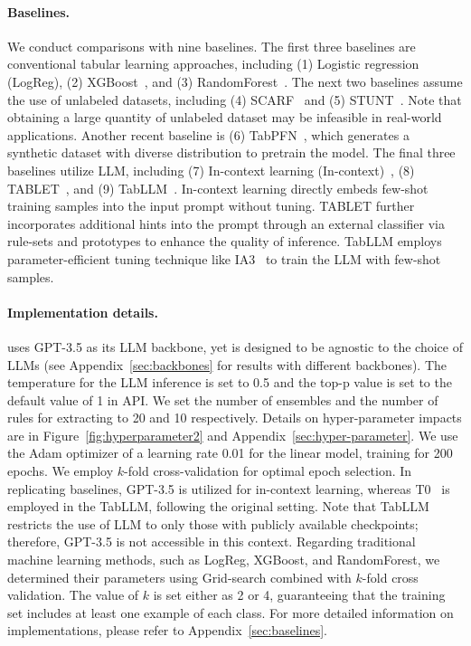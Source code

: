 \documentclass{article}
\theoremstyle{plain}
\theoremstyle{definition}
\theoremstyle{remark}
\newcommand{\cutparagraphup}{\vspace*{-0.12in}}
\begin{document}
\cutparagraphup
\paragraph{Baselines.}
We conduct comparisons with nine baselines. The first three baselines are conventional tabular learning approaches, including (1) Logistic regression (LogReg), (2) XGBoost~\cite{chen2016xgboost}, and (3) RandomForest~\cite{ho1995random}. The next two baselines assume the use of unlabeled datasets, including (4) SCARF~\cite{bahri2022scarf} and (5) STUNT~\cite{nam2023stunt}. Note that obtaining a large quantity of unlabeled dataset may be infeasible in real-world applications. Another recent baseline is (6) TabPFN~\cite{hollmann2022tabpfn}, which generates a synthetic dataset with diverse distribution to pretrain the model. The final three baselines utilize LLM, including (7) In-context learning (In-context)~\cite{wei2022emergent}, (8) TABLET~\cite{slack2023tablet}, and (9) TabLLM~\cite{hegselmann2023tabllm}. In-context learning directly embeds few-shot training samples into the input prompt without tuning. TABLET further incorporates additional hints into the prompt through an external classifier via rule-sets and prototypes to enhance the quality of inference. TabLLM employs parameter-efficient tuning technique like IA3~\cite{liu2022few} to train the LLM with few-shot samples. 



\cutparagraphup
\paragraph{Implementation details.}
\model{} uses GPT-3.5 as its LLM backbone, yet is designed to be agnostic to the choice of LLMs (see Appendix~\ref{sec:backbones} for results with different backbones). 
The temperature for the LLM inference is set to 0.5 and the top-p value is set to the default value of 1 in API. We set the number of ensembles and the number of rules for extracting to 20 and 10 respectively. Details on hyper-parameter impacts are in Figure~\ref{fig:hyperparameter2} and Appendix~\ref{sec:hyper-parameter}.
We use the Adam optimizer of a learning rate 0.01 for the linear model, training for 200 epochs. We employ $k$-fold cross-validation for optimal epoch selection. In replicating baselines, GPT-3.5 is utilized for in-context learning, whereas T0~\cite{sanh2022multitask} is employed in the TabLLM, following the original setting. Note that TabLLM restricts the use of LLM to only those with publicly available checkpoints; therefore, GPT-3.5 is not accessible in this context. Regarding traditional machine learning methods, such as LogReg, XGBoost, and RandomForest, we determined their parameters using Grid-search combined with $k$-fold cross validation. The value of $k$ is set either as 2 or 4, guaranteeing that the training set includes at least one example of each class. For more detailed information on implementations, please refer to Appendix~\ref{sec:baselines}. 
\end{document}
